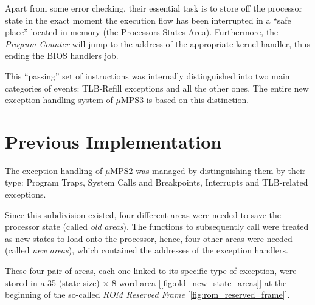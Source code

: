 \documentclass[12pt,a4paper,openright,twoside]{report}
\begin{document}
Apart from some error checking, their essential task is to store off the processor state in the exact moment the execution flow has been interrupted in a ``safe place'' located in memory (the Processors States Area).
Furthermore, the \textit{Program Counter} will jump to the address of the appropriate kernel handler, thus ending the BIOS handlers job.

This ``passing'' set of instructions was internally distinguished into two main categories of events: TLB-Refill exceptions and all the other ones.
The entire new exception handling system of $\mu$MPS3 is based on this distinction.

\section{Previous Implementation}
The exception handling of $\mu$MPS2 was managed by distinguishing them by their type: Program Traps, System Calls and Breakpoints, Interrupts and TLB-related exceptions.

Since this subdivision existed, four different areas were needed to save the processor state (called \textit{old areas}).
The functions to subsequently call were treated as new states to load onto the processor, hence, four other areas were needed (called \textit{new areas}), which contained the addresses of the exception handlers.

These four pair of areas, each one linked to its specific type of exception, were stored in a 35 (state size) $\times$ 8 word area [\autoref{fig:old_new_state_areas}] at the beginning of the so-called \textit{ROM Reserved Frame} [\autoref{fig:rom_reserved_frame}].
\end{document}
